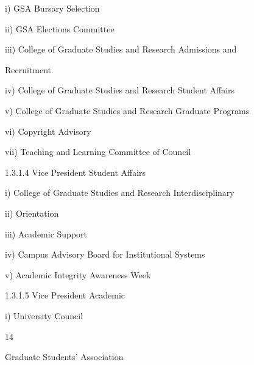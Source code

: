   

          i)        GSA Bursary Selection   

  

          ii)       GSA Elections Committee   

  

          iii)      College  of  Graduate  Studies  and  Research  Admissions  and  

                    Recruitment   

  

          iv)       College of Graduate Studies and Research Student Affairs   

  

          v)        College of Graduate Studies and Research Graduate Programs   

  

          vi)       Copyright Advisory   

  

          vii)      Teaching and Learning Committee of Council   

  

1.3.1.4             Vice President Student Affairs   

  

          i)        College of Graduate Studies and Research Interdisciplinary   

  

          ii)       Orientation   

  

          iii)      Academic Support   

  

          iv)       Campus Advisory Board for Institutional Systems   

  

          v)        Academic Integrity Awareness Week   

  

1.3.1.5             Vice President Academic   

  

          i)        University Council   

  



                                                          14  

                                         

                                       Graduate Students’ Association  

